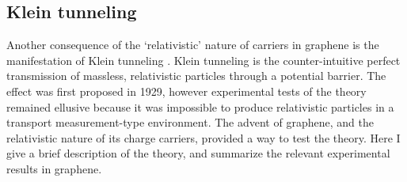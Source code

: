 \documentclass[edeposit,fullpage,draftthesis]{uiucthesis2009}
\begin{document}
    \subsection{Klein tunneling}
    
        Another consequence of the `relativistic' nature of carriers in graphene is the manifestation
        of Klein tunneling \cite{katsnelson2006chiral, cheianov2007focusing, beenakker2008colloquium, stander2009evidence, bai2007klein, young2009quantum}. 
        Klein tunneling \cite{klein1929reflexion} is the counter-intuitive perfect
        transmission of massless, relativistic particles through a potential barrier. The effect
        was first proposed in 1929, however experimental tests of the theory remained ellusive
        because it was impossible to produce relativistic particles in a transport measurement-type
        environment.
        The advent of graphene, and the relativistic nature of its charge carriers,
        provided a way to test the theory. Here I give a brief description of
        the theory, and summarize the relevant experimental results in graphene.
        
\end{document}
